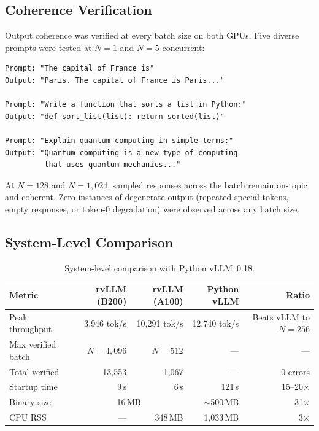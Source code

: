 \documentclass[11pt,a4paper]{article}
\newcommand{\thead}[1]{\textbf{\color{white}#1}}
\begin{document}
\subsection{Coherence Verification}

Output coherence was verified at every batch size on both GPUs. Five diverse
prompts were tested at $N\!=\!1$ and $N\!=\!5$ concurrent:

\begin{lstlisting}[language={},numbers=none,frame=none,xleftmargin=0em]
Prompt: "The capital of France is"
Output: "Paris. The capital of France is Paris..."

Prompt: "Write a function that sorts a list in Python:"
Output: "def sort_list(list): return sorted(list)"

Prompt: "Explain quantum computing in simple terms:"
Output: "Quantum computing is a new type of computing
         that uses quantum mechanics..."
\end{lstlisting}

At $N\!=\!128$ and $N\!=\!1{,}024$, sampled responses across the batch remain
on-topic and coherent. Zero instances of degenerate output (repeated special tokens,
empty responses, or token-0 degradation) were observed across any batch size.

\subsection{System-Level Comparison}

\begin{table}[t]
  \centering
  \caption{System-level comparison with Python vLLM~0.18.}
  \label{tab:system}
  \small
  \begin{tabular}{@{}lrrrr@{}}
    \toprule
    \rowcolor{HeaderBlue} \thead{Metric} & \thead{rvLLM (B200)} & \thead{rvLLM (A100)} & \thead{Python vLLM} & \thead{Ratio} \\
    \midrule
    Peak throughput    & 3{,}946 tok/s & 10{,}291 tok/s & 12{,}740 tok/s & Beats vLLM to $N\!=\!256$ \\
    \rowcolor{gray!8}
    Max verified batch & $N\!=\!4{,}096$ & $N\!=\!512$ & --- & --- \\
    Total verified     & 13{,}553 & 1{,}067 & --- & 0 errors \\
    \rowcolor{gray!8}
    Startup time       & 9\,s    & 6\,s    & 121\,s  & 15--20$\times$ \\
    Binary size        & \multicolumn{2}{c}{16\,MB} & $\sim$500\,MB & 31$\times$ \\
    \rowcolor{gray!8}
    CPU RSS            & ---     & 348\,MB & 1{,}033\,MB & 3$\times$ \\
    \bottomrule
  \end{tabular}
\end{table}
\end{document}
